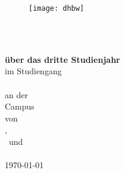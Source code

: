 
\begin{titlepage}


\begin{figure}
	\centering
		\texttt{[image: dhbw]}
\end{figure}


\begin{center}
	\vspace*{0pt}
	\begin{LARGE}
		\textbf{\mytitle}\\
	\end{LARGE}
	\vspace*{4em}
	\textbf{\MakeUppercase{\mytypeofwork}\\über das dritte Studienjahr}\\
	\vspace*{2em}
	im Studiengang\\
	\mycourse\\
	\vspace*{2em}
	an der \myuniversity\\
	Campus \myuniversitycampus\\
	\vspace*{2em}
	von\\
	\vspace*{2em}
	\myauthora,\\\myauthorb\ und\\\myauthorc\\
	\vspace*{2em}
	\today\\
	\vspace*{3em}
	\vfill
	

\end{center}
\end{titlepage}
